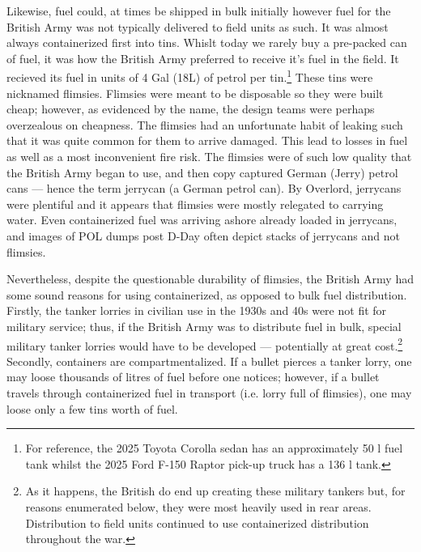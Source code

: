 \documentclass[noraggedright]{turabian-researchpaper}
\newcommand{\Petrol}{Precis of Lecture No. 12:  Petrol}
\begin{document}
Likewise, fuel could, at times be shipped in bulk initially however fuel for
the British Army was not typically delivered to field units as such.  It was 
almost always containerized first into tins.  Whislt today we rarely buy a 
pre-packed can of fuel, it was how the British Army preferred to receive it's 
fuel in the field.  It recieved its fuel in units of 4 Gal (18L) of 
petrol per tin.\footnote {\cite[\Petrol][3]{27course}
For reference, the 2025 Toyota Corolla sedan has an approximately 50 l fuel 
tank whilst the 2025 Ford F-150 Raptor pick-up truck has a 136 l tank.} %
These tins were nicknamed flimsies.  Flimsies were meant to be disposable so 
they were built cheap; however, as evidenced by the name, the design teams 
were perhaps overzealous on cheapness.  The flimsies had an unfortunate habit
of leaking such that it was quite common for them to arrive damaged. This 
lead to losses in fuel as well as a most inconvenient fire risk.\autocite
[179, 198-9]{feat} The flimsies were of such low quality that the British 
Army began to use, and then copy captured German (Jerry) petrol cans --- 
hence the term jerrycan (a German petrol can).\autocite[179]{feat} By 
Overlord, jerrycans were plentiful and it appears that flimsies were mostly 
relegated to carrying water.  Even containerized fuel was arriving ashore 
already loaded in jerrycans, and images of POL dumps post D-Day often depict 
stacks of jerrycans and not flimsies.\autocite[8:30 -- 10:55]{buildup}


Nevertheless, despite the questionable durability of flimsies, the British 
Army had some sound reasons for using containerized, as opposed to bulk fuel
distribution.  Firstly, the tanker lorries in civilian use in the 1930s and 
40s were not fit for military service; thus, if the British Army was to 
distribute fuel in bulk, special military tanker lorries would have to be 
developed --- potentially at great cost.\footnote{\cite[178]{feat}  
As it happens, the British do end up creating these military tankers but, for 
reasons enumerated below, they were most heavily used in rear areas.  
Distribution to field units continued to use containerized distribution 
throughout the war.\cite[184-7]{feat}} Secondly,
containers are compartmentalized.  If a bullet pierces a tanker lorry, one may
loose thousands of litres of fuel before one notices; however, if a bullet 
travels through containerized fuel in transport (i.e. lorry full of flimsies),
one may loose only a few tins worth of fuel.\autocite[\Petrol][Table at para 8]
{27course}  
\end{document}
